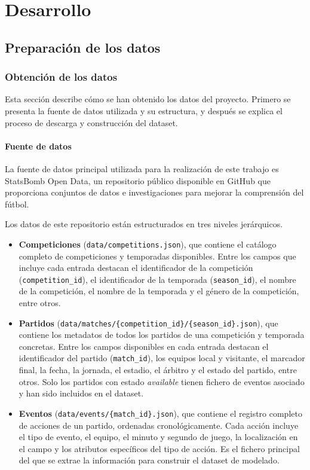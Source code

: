 \chapter{Desarrollo}

\section{Preparación de los datos}

\subsection{Obtención de los datos}

Esta sección describe cómo se han obtenido los datos del proyecto. Primero se presenta la fuente de datos utilizada y su estructura, y después se explica el proceso de descarga y construcción del dataset.

\subsubsection{Fuente de datos}

La fuente de datos principal utilizada para la realización de este trabajo es StatsBomb Open Data, un repositorio público disponible en GitHub que proporciona conjuntos de datos e investigaciones para mejorar la comprensión del fútbol.

Los datos de este repositorio están estructurados en tres niveles jerárquicos.
\begin{itemize}
    \item \textbf{Competiciones} (\texttt{data/competitions.json}), que contiene el catálogo completo de competiciones y temporadas disponibles. Entre los campos que incluye cada entrada destacan el identificador de la competición (\texttt{competition\_id}), el identificador de la temporada (\texttt{season\_id}), el nombre de la competición, el nombre de la temporada y el género de la competición, entre otros.

    \item \textbf{Partidos} (\texttt{data/matches/\{competition\_id\}/\{season\_id\}.json}), que contiene los metadatos de todos los partidos de una competición y temporada concretas. Entre los campos disponibles en cada entrada destacan el identificador del partido (\texttt{match\_id}), los equipos local y visitante, el marcador final, la fecha, la jornada, el estadio, el árbitro y el estado del partido, entre otros. Solo los partidos con estado \textit{available} tienen fichero de eventos asociado y han sido incluidos en el dataset.

    \item \textbf{Eventos} (\texttt{data/events/\{match\_id\}.json}), que contiene el registro completo de acciones de un partido, ordenadas cronológicamente. Cada acción incluye el tipo de evento, el equipo, el minuto y segundo de juego, la localización en el campo y los atributos específicos del tipo de acción. Es el fichero principal del que se extrae la información para construir el dataset de modelado.
\end{itemize}

